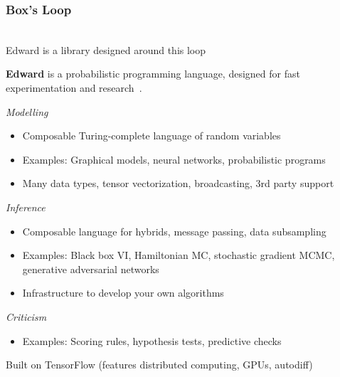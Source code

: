 \documentclass[10pt]{beamer}
\begin{document}
\begin{frame}
\frametitle{Box's Loop}
\center
 \\
\vspace{20pt}
Edward is a library designed around this loop \\
\citep{box_science_1976-1, box_sampling_1980-1, david_m._blei_build_2014}
\end{frame}


\begin{frame}
\vspace{3ex}
\textbf{Edward} is a probabilistic programming language,
designed for fast experimentation and research~\citep{tran_deep_2017}.

\emph{Modelling}
\begin{itemize}
\item Composable Turing-complete language of random variables
\item Examples: Graphical models, neural networks, probabilistic programs
\item Many data types, tensor vectorization, broadcasting, 3rd party support
\end{itemize}

\emph{Inference}
\begin{itemize}
\item Composable language for hybrids, message passing, data subsampling
\item Examples: Black box VI, Hamiltonian MC, stochastic gradient MCMC,
  generative adversarial networks
\item Infrastructure to develop your own algorithms
\end{itemize}

\emph{Criticism}
\begin{itemize}
\item Examples: Scoring rules, hypothesis tests, predictive checks
\end{itemize}

\vspace{1ex}
Built on TensorFlow (features distributed computing, GPUs, autodiff)
\end{frame}

\begin{frame}[fragile]
  \inputminted{python}{python/beta-bernoulli.py}
\end{frame}
\end{document}

